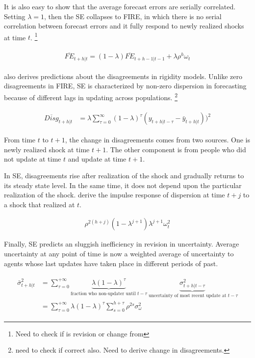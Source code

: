 \documentclass[]{article}
\begin{document}
	It is also easy to show that the average forecast errors are serially correlated. Setting $\lambda=1$, then the SE collapses to FIRE, in which there is no serial correlation between forecast errors and it fully respond to newly realized shocks at time $t$.  \footnote{Need to check if is revision or change from}
	
	\begin{eqnarray}
		\begin{aligned}
			\overline{FE}_{t+h|t}  = (1-\lambda) \overline {FE}_{t+h-1|t-1} + \lambda \rho^h \omega_t 
		\end{aligned}
	\end{eqnarray}
	
	
	\citet{coibion2012can} also derives predictions about the disagreements in rigidity models. Unlike zero disagreements in FIRE, SE is characterized by non-zero dispersion in forecasting because of different lags in updating across populations. \footnote{need to check if correct also. Need to derive change in disagreements.} 
	
	\begin{eqnarray}
		\begin{aligned}
			\overline{Disg}_{t+h|t} & = \lambda \sum^{\infty}_{\tau=0} (1-\lambda)^{\tau} (y_{t+h|t-\tau} - \bar y_{t+h|t }))^2  
		\end{aligned}
	\end{eqnarray}
	
	From time $t$ to $t+1$, the change in disagreements comes from two sources. One is newly realized shock at time $t+1$. The other component is from people who did not update at time $t$ and update at time $t+1$.  
	
	In SE, disagreements rise after realization of the shock and gradually returns to its steady state level. In the same time, it does not depend upon the particular realization of the shock. \citet{coibion2012can} derive the impulse response of dispersion at time $t+j$ to a shock that realized at $t$. 
	
	\begin{eqnarray}
		\rho^{2(h+j)} (1-\lambda^{j+1})\lambda^{j+1} \omega^2_t
	\end{eqnarray}
	
	Finally, SE predicts an sluggish inefficiency in revision in uncertainty. Average uncertainty at any point of time is now a weighted average of uncertainty to agents whose last updates have taken place in different periods of past.  
	
	\begin{eqnarray}\label{VarSEPop}
		\begin{aligned}
			\bar \sigma^2_{t+h|t} & = \sum^{+\infty}_{\tau =0} \underbrace{\lambda (1-\lambda)^\tau}_{\text{fraction who non-updater until }t-\tau} \underbrace{\sigma^2_{t+h|t-\tau}}_{\text{ uncertainty of most recent update at }t-\tau} \\
			& = \sum^{+\infty}_{\tau =0} \lambda (1-\lambda)^\tau \sum^{h+\tau}_{s=0}\rho^{2s} \sigma^2_{\omega}
		\end{aligned}
	\end{eqnarray}
	
\end{document}

